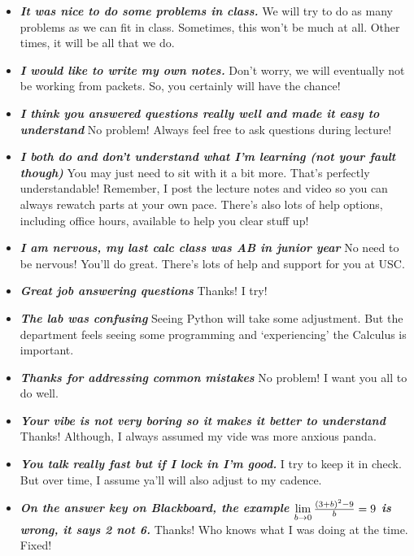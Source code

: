 \documentclass[11pt,letterpaper]{article}
\begin{document}
\begin{itemize}
\item {\bfseries\itshape It was nice to do some problems in class.} We will try to do as many problems as we can fit in class. Sometimes, this won't be much at all. Other times, it will be all that we do.

\item {\bfseries\itshape I would like to write my own notes.} Don't worry, we will eventually not be working from packets. So, you certainly will have the chance!

\item {\bfseries\itshape I think you answered questions really well and made it easy to understand} No problem! Always feel free to ask questions during lecture!

\item {\bfseries\itshape I both do and don't understand what I'm learning (not your fault though)} You may just need to sit with it a bit more. That's perfectly understandable! Remember, I post the lecture notes and video so you can always rewatch parts at your own pace. There's also lots of help options, including office hours, available to help you clear stuff up!

\item {\bfseries\itshape I am nervous, my last calc class was AB in junior year} No need to be nervous! You'll do great. There's lots of help and support for you at USC.

\item {\bfseries\itshape Great job answering questions} Thanks! I try!

\item {\bfseries\itshape The lab was confusing} Seeing Python will take some adjustment. But the department feels seeing some programming and `experiencing' the Calculus is important. 

\item {\bfseries\itshape Thanks for addressing common mistakes} No problem! I want you all to do well. 

\item {\bfseries\itshape Your vibe is not very boring so it makes it better to understand} Thanks! Although, I always assumed my vide was more anxious panda. 

\item {\bfseries\itshape You talk really fast but if I lock in I'm good.} I try to keep it in check. But over time, I assume ya'll will also adjust to my cadence. 

\item {\bfseries\itshape On the answer key on Blackboard, the example $\displaystyle\lim_{b \to 0} \tfrac{(3 + b)^2 - 9}{b}= 9$ is wrong, it says 2 not 6.} Thanks! Who knows what I was doing at the time. Fixed!


\end{itemize}
\end{document}
